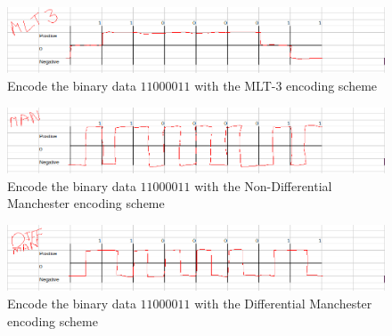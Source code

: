 
\begin{figure}[h]
  \caption{Encode the binary data $11000011$ with the MLT-3 encoding scheme}
  \includegraphics[width=0.9\linewidth]{assets/sem1-ex1.png}
  \centering
\end{figure}

\begin{figure}[h]
  \caption{Encode the binary data $11000011$ with the Non-Differential Manchester encoding scheme}
  \includegraphics[width=0.9\linewidth]{assets/sem1-ex2.png}
  \centering
\end{figure}

\begin{figure}[h]
  \caption{Encode the binary data $11000011$ with the Differential Manchester encoding scheme}
  \includegraphics[width=0.9\linewidth]{assets/sem1-ex3.png}
  \centering
\end{figure}